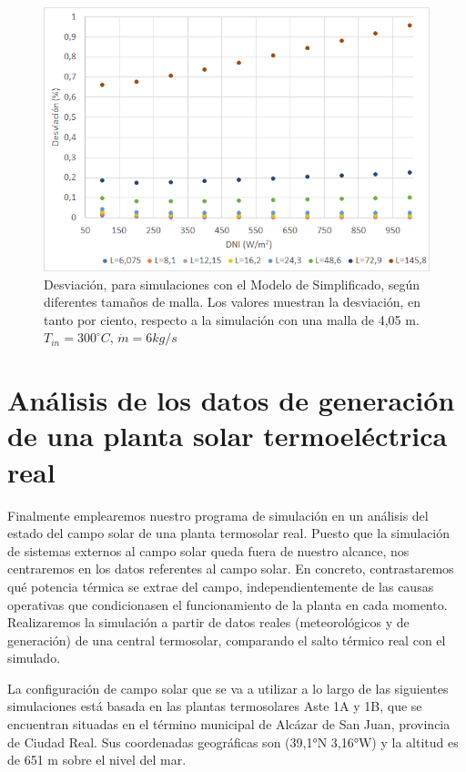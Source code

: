 \begin{figure}[H]
\includegraphics[width=0.9\linewidth]{images/desviacionmodelsimplificadomalla.png}
\caption[Desviación, para simulaciones con el Modelo de Simplificado, según diferentes tamaños de malla]{Desviación, para simulaciones con el Modelo de Simplificado, según diferentes tamaños de malla. Los valores muestran la desviación, en tanto por ciento, respecto a la simulación con una malla de 4,05 m. $T_{in}=300 ^\circ C$, $\dot m = 6 kg/s$} 
\label{fig:desviacionmodelsimplificado}
\end{figure}


\section{Análisis de los datos de generación de una planta solar termoeléctrica real}
\label{descripcion-central}

Finalmente emplearemos nuestro programa de simulación en un análisis del estado del campo solar de una planta termosolar real. Puesto que la simulación de sistemas externos al campo solar queda fuera de nuestro alcance, nos centraremos en los datos referentes al campo solar. En concreto, contrastaremos  qué potencia térmica se extrae del campo, independientemente de las causas operativas que condicionasen el funcionamiento de la planta en cada momento. Realizaremos la simulación a partir de datos reales (meteorológicos y de generación) de una central termosolar, comparando el salto térmico real con el simulado. 

La configuración de campo solar que se va a utilizar a lo largo de las siguientes simulaciones está basada en las plantas termosolares Aste 1A y 1B, que se encuentran situadas en el término municipal de Alcázar de San Juan, provincia de Ciudad Real. Sus coordenadas geográficas son (39,1°N 3,16°W) y la altitud es de 651 m sobre el nivel del mar.


